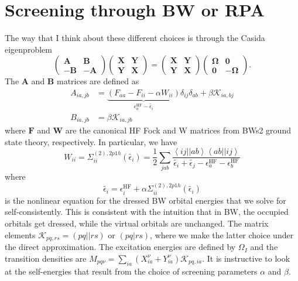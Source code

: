 \section{Screening through BW or RPA}
The way that I think about these different choices is through the Casida eigenproblem
\begin{equation}
    \begin{pmatrix}
        \bm{A} & \bm{B} \\
        -\bm{B} & -\bm{A}
    \end{pmatrix}
    \begin{pmatrix}
        \bm{X} & \bm{Y} \\
        \bm{Y} & \bm{X}
    \end{pmatrix}
=
    \begin{pmatrix}
        \bm{X} & \bm{Y} \\
        \bm{Y} & \bm{X}
    \end{pmatrix}
    \begin{pmatrix}
        \bm{\Omega} & \bm{0} \\
        \bm{0} & -\bm{\Omega}
    \end{pmatrix}.
    \label{eqn:casida_eq}
\end{equation}
The $\bm{A}$ and $\bm{B}$ matrices are defined as
\begin{align}
    A_{i a, j b} &= \underbrace{\left(F_{aa}-F_{ii}-\alpha W_{ii}\right)}_{{\epsilon_a^{\text{HF}}} - \tilde{\epsilon_i}} \delta_{i j} \delta_{a b}+\beta\mathcal{K}_{i a, b j} \\
    B_{i a, j b} &= \beta \mathcal{K}_{i a, j b}
\end{align}
where $\bm{F}$ and $\bm{W}$ are the canonical HF Fock and W matrices from BWs2 ground state theory, respectively. In particular, we have
\begin{equation}
    W_{ii} = \Sigma^{(2),2p1h}_{ii}(\tilde{\epsilon_i})=\frac{1}{2}\sum_{jab}\frac{\left<ij||ab\right>\left<ab||ij\right>}{\tilde{\epsilon_i}+\tilde{\epsilon_j}-\epsilon_a^{\text{HF}}-\epsilon_b^{\text{HF}}}
\end{equation}
where
\begin{equation}
    \tilde{\epsilon_i}= \epsilon_i^{\text{HF}} + \alpha  \Sigma^{(2),2p1h}_{ii}(\tilde{\epsilon_i})
\end{equation}
is the nonlinear equation for the dressed BW orbital energies that we solve for self-consistently. This is consistent with the intuition that in BW, the occupied orbitals get dressed, while the virtual orbitals are unchanged. 
 The matrix elements $\mathcal{K}_{pq, rs}=(pq||rs)$ or $(pq|rs)$, where we make the latter choice under the direct approximation. The excitation energies are defined by $\Omega_I$ and the transition densities are $M_{pq\nu}=\sum_{i a}\left(X_{i a}^{\nu}+Y_{i a}^{\nu}\right)\mathcal{K}_{pq, ia}$. It is instructive to look at the self-energies that result from the choice of screening parameters \(\alpha\) and \(\beta\).

